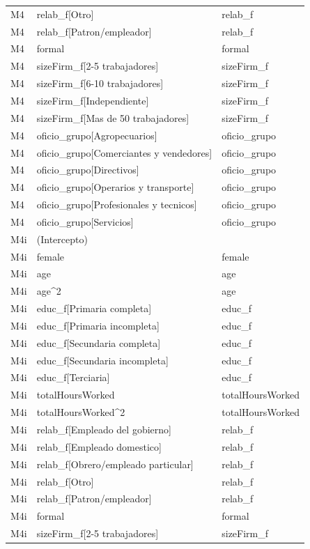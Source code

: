 \begin{longtable}{lll}
M4 & relab\_f[Otro] & relab\_f \\
M4 & relab\_f[Patron/empleador] & relab\_f \\
M4 & formal & formal \\
M4 & sizeFirm\_f[2-5 trabajadores] & sizeFirm\_f \\
M4 & sizeFirm\_f[6-10 trabajadores] & sizeFirm\_f \\
M4 & sizeFirm\_f[Independiente] & sizeFirm\_f \\
M4 & sizeFirm\_f[Mas de 50 trabajadores] & sizeFirm\_f \\
M4 & oficio\_grupo[Agropecuarios] & oficio\_grupo \\
M4 & oficio\_grupo[Comerciantes y vendedores] & oficio\_grupo \\
M4 & oficio\_grupo[Directivos] & oficio\_grupo \\
M4 & oficio\_grupo[Operarios y transporte] & oficio\_grupo \\
M4 & oficio\_grupo[Profesionales y tecnicos] & oficio\_grupo \\
M4 & oficio\_grupo[Servicios] & oficio\_grupo \\
M4i & (Intercepto) &  \\
M4i & female & female \\
M4i & age & age \\
M4i & age\textasciicircum 2 & age \\
M4i & educ\_f[Primaria completa] & educ\_f \\
M4i & educ\_f[Primaria incompleta] & educ\_f \\
M4i & educ\_f[Secundaria completa] & educ\_f \\
M4i & educ\_f[Secundaria incompleta] & educ\_f \\
M4i & educ\_f[Terciaria] & educ\_f \\
M4i & totalHoursWorked & totalHoursWorked \\
M4i & totalHoursWorked\textasciicircum 2 & totalHoursWorked \\
M4i & relab\_f[Empleado del gobierno] & relab\_f \\
M4i & relab\_f[Empleado domestico] & relab\_f \\
M4i & relab\_f[Obrero/empleado particular] & relab\_f \\
M4i & relab\_f[Otro] & relab\_f \\
M4i & relab\_f[Patron/empleador] & relab\_f \\
M4i & formal & formal \\
M4i & sizeFirm\_f[2-5 trabajadores] & sizeFirm\_f \\

\end{longtable}
